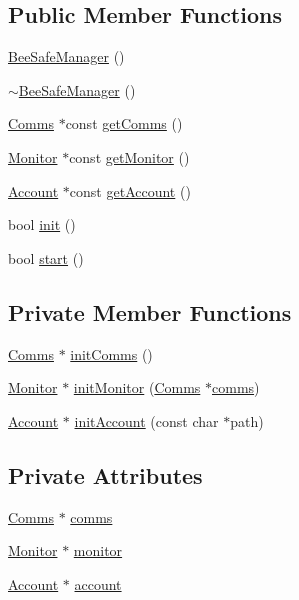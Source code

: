 \subsection*{Public Member Functions}
\begin{DoxyCompactItemize}
\item 
\hyperlink{class_bee_safe_manager_a4a897d6317bdc548fb235d0cdb2877b1}{Bee\+Safe\+Manager} ()
\item 
\hyperlink{class_bee_safe_manager_ac99fb148bcac3aa3f51e96fdf7bc0c1b}{$\sim$\+Bee\+Safe\+Manager} ()
\item 
\hyperlink{class_comms}{Comms} $\ast$const \hyperlink{class_bee_safe_manager_a8c4c98723335cfcc179fcbf3f8c3d9d3}{get\+Comms} ()
\item 
\hyperlink{class_monitor}{Monitor} $\ast$const \hyperlink{class_bee_safe_manager_acc33322594eea80e4b4b21e580713c00}{get\+Monitor} ()
\item 
\hyperlink{class_account}{Account} $\ast$const \hyperlink{class_bee_safe_manager_a4052276ed4263cdbe715ce115e1ccee2}{get\+Account} ()
\item 
bool \hyperlink{class_bee_safe_manager_a2f16b09c454e21c887d14ac5483973cf}{init} ()
\item 
bool \hyperlink{class_bee_safe_manager_a7242d89761621de0e09ec9ea360fca27}{start} ()
\end{DoxyCompactItemize}
\subsection*{Private Member Functions}
\begin{DoxyCompactItemize}
\item 
\hyperlink{class_comms}{Comms} $\ast$ \hyperlink{class_bee_safe_manager_a28306d7ccf7136a6086d666f4ebb6566}{init\+Comms} ()
\item 
\hyperlink{class_monitor}{Monitor} $\ast$ \hyperlink{class_bee_safe_manager_ad30babe45ead2cb6a5b0559afa5bc5ff}{init\+Monitor} (\hyperlink{class_comms}{Comms} $\ast$\hyperlink{class_bee_safe_manager_a80b19afbb679d08be14d67a45447f9e1}{comms})
\item 
\hyperlink{class_account}{Account} $\ast$ \hyperlink{class_bee_safe_manager_a7395aeacd246ce69c65f255a2eab1d04}{init\+Account} (const char $\ast$path)
\end{DoxyCompactItemize}
\subsection*{Private Attributes}
\begin{DoxyCompactItemize}
\item 
\hyperlink{class_comms}{Comms} $\ast$ \hyperlink{class_bee_safe_manager_a80b19afbb679d08be14d67a45447f9e1}{comms}
\item 
\hyperlink{class_monitor}{Monitor} $\ast$ \hyperlink{class_bee_safe_manager_a3b885b4fb364228c914095f2e670f9af}{monitor}
\item 
\hyperlink{class_account}{Account} $\ast$ \hyperlink{class_bee_safe_manager_a52bc9bc8c1ea9608b83d603b142443b0}{account}
\end{DoxyCompactItemize}



